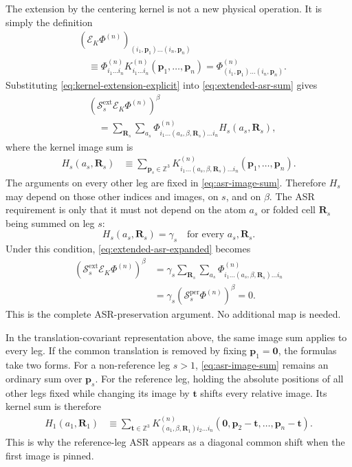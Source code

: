 \documentclass{article}
\newcommand{\ASR}{\mathcal S}
\newcommand{\Ext}{\mathcal E}
\begin{document}
The extension by the centering kernel is not a new physical operation. It
is simply the definition
\begin{align}
    &\left(\Ext_K\Phi^{(n)}\right)_
    {(i_1,\bm p_1)\ldots(i_n,\bm p_n)}
    \nonumber\\
    &\quad\equiv
    \Phi^{(n)}_{i_1\ldots i_n}
    K^{(n)}_{i_1\ldots i_n}
    (\bm p_1,\ldots,\bm p_n)
    =
    \varPhi^{(n)}_
    {(i_1,\bm p_1)\ldots(i_n,\bm p_n)}.
    \label{eq:kernel-extension-explicit}
\end{align}
Substituting \autoref{eq:kernel-extension-explicit} into
\autoref{eq:extended-asr-sum} gives
\begin{align}
    &\left(\ASR_s^{\mathrm{ext}}\Ext_K\Phi^{(n)}\right)^\beta
    \nonumber\\
    &\quad=
    \sum_{\bm R_s}
    \sum_{a_s}
    \Phi^{(n)}_
    {i_1\ldots(a_s,\beta,\bm R_s)\ldots i_n}
    H_s(a_s,\bm R_s),
    \label{eq:extended-asr-expanded}
\end{align}
where the kernel image sum is
\begin{align}
    H_s(a_s,\bm R_s)
    &\equiv
    \sum_{\bm p_s\in\mathbb Z^3}
    K^{(n)}_
    {i_1\ldots(a_s,\beta,\bm R_s)\ldots i_n}
    (\bm p_1,\ldots,\bm p_n).
    \label{eq:asr-image-sum}
\end{align}
The arguments on every other leg are fixed in
\autoref{eq:asr-image-sum}. Therefore $H_s$ may depend on those other
indices and images, on $s$, and on $\beta$. The ASR requirement is only
that it must not depend on the atom $a_s$ or folded cell $\bm R_s$ being
summed on leg $s$:
\begin{equation}
    H_s(a_s,\bm R_s)=\gamma_s
    \quad\text{for every }a_s,\bm R_s.
    \label{eq:asr-constant-image-sum}
\end{equation}
Under this condition, \autoref{eq:extended-asr-expanded} becomes
\begin{align}
    \left(\ASR_s^{\mathrm{ext}}\Ext_K\Phi^{(n)}\right)^\beta
    &=
    \gamma_s
    \sum_{\bm R_s}\sum_{a_s}
    \Phi^{(n)}_
    {i_1\ldots(a_s,\beta,\bm R_s)\ldots i_n}
    \nonumber\\
    &=
    \gamma_s
    \left(\ASR_s^{\mathrm{per}}\Phi^{(n)}\right)^\beta
    =0.
    \label{eq:asr-preservation-explicit}
\end{align}
This is the complete ASR-preservation argument. No additional map is
needed.

In the translation-covariant representation above, the same image sum
applies to every leg. If the common translation is removed by fixing
$\bm p_1=\bm0$, the formulas take two forms. For a non-reference leg
$s>1$, \autoref{eq:asr-image-sum} remains an ordinary sum over
$\bm p_s$. For the reference leg, holding the absolute positions of all
other legs fixed while changing its image by $\bm t$ shifts every relative
image. Its kernel sum is therefore
\begin{align}
    H_1(a_1,\bm R_1)
    &\equiv
    \sum_{\bm t\in\mathbb Z^3}
    K^{(n)}_{(a_1,\beta,\bm R_1)i_2\ldots i_n}
    (\bm0,\bm p_2-\bm t,\ldots,\bm p_n-\bm t).
    \label{eq:asr-reference-diagonal-sum}
\end{align}
This is why the reference-leg ASR appears as a diagonal common shift when
the first image is pinned.
\end{document}
